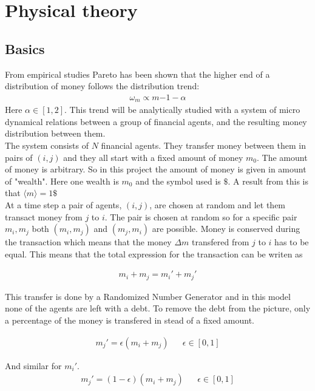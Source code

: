 \section{Physical theory}\label{sec:phys-theory}
\subsection{Basics}\label{sec:basics}

 From empirical studies Pareto has been shown that the higher end of a distribution of money follows the distribution trend\cite{paretoslaw}:
 \begin{align}
 	\omega_m\propto m{-1-\alpha}\label{eq:pareto}
 \end{align} 
Here $\alpha\in[1,2]$. This trend will be analytically studied with a system of micro dynamical relations between a group of financial agents, and the resulting money distribution between them. \\


The system consists of $N$ financial agents. They transfer money between them in pairs of $(i,j)$ and they all start with a fixed amount of money $m_0$. The amount of money is arbitrary. So in this project the amount of money is given in amount of "wealth". Here one wealth is $m_0$ and the symbol used is $\$$. A result from this is that $\langle m\rangle=1\$ $\\

At a time step a pair of agents, $(i,j)$, are chosen at random and let them transact money from $j$ to $i$. The pair is chosen at random so for a specific pair $m_i,m_j$ both $(m_i,m_j)$ and $(m_j,m_i)$ are possible. Money is conserved during the transaction which means that the money $\Delta m$ transfered from $j$ to $i$ has to be equal. This means that the total expression for the transaction can be writen as

\begin{align}
	m_i+m_j=m_i'+m_j'\label{eq:pengerbevart}
\end{align}

This transfer is done by a Randomized Number Generator and in this model none of the agents are left with a debt. To remove the debt from the picture, only a percentage of the money is transfered in stead of a fixed amount.

\begin{align}
	m_j'=\epsilon(m_i+m_j)&&\epsilon\in[0,1]\label{epsiloncrit}
\end{align}

And similar for $m_i'$.
\begin{align*}
	m_j'=(1-\epsilon)(m_i+m_j)&&\epsilon\in[0,1]
\end{align*}

